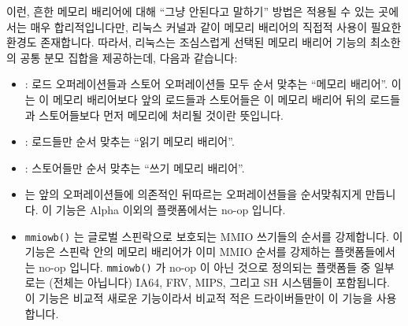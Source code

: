 이런, 흔한 메모리 배리어에 대해 ``그냥 안된다고 말하기'' 방법은 적용될 수 있는
곳에서는 매우 합리적입니다만, 리눅스 커널과 같이 메모리 배리어의 직접적 사용이
필요한 환경도 존재합니다.
따라서, 리눅스는 조심스럽게 선택된 메모리 배리어 기능의 최소한의 공통 분모
집합을 제공하는데, 다음과 같습니다:
\begin{itemize}
\item	{}: 로드 오퍼레이션들과 스토어 오퍼레이션들 모두 순서
	맞추는 ``메모리 배리어''.
	이는 이 메모리 배리어보다 앞의 로드들과 스토어들은 이 메모리 배리어
	뒤의 로드들과 스토어들보다 먼저 메모리에 처리될 것이란 뜻입니다.
\item	{}: 로드들만 순서 맞추는 ``읽기 메모리 배리어''.
\item	{}: 스토어들만 순서 맞추는 ``쓰기 메모리 배리어''.
\item	{} 는 앞의 오퍼레이션들에 의존적인
	뒤따르는 오퍼레이션들을 순서맞춰지게 만듭니다.
	이 기능은 Alpha 이외의 플랫폼에서는 no-op 입니다.
\item	{\tt mmiowb()} 는 글로벌 스핀락으로 보호되는 MMIO 쓰기들의 순서를
	강제합니다.
	이 기능은 스핀락 안의 메모리 배리어가 이미 MMIO 순서를 강제하는
	플랫폼들에서는 no-op 입니다.
	{\tt mmiowb()} 가 no-op 이 아닌 것으로 정의되는 플랫폼들 중 일부로는
	(전체는 아닙니다) IA64, FRV, MIPS, 그리고 SH 시스템들이 포함됩니다.
	이 기능은 비교적 새로운 기능이라서 비교적 적은 드라이버들만이 이 기능을
	사용합니다.
\end{itemize}
\iffalse


